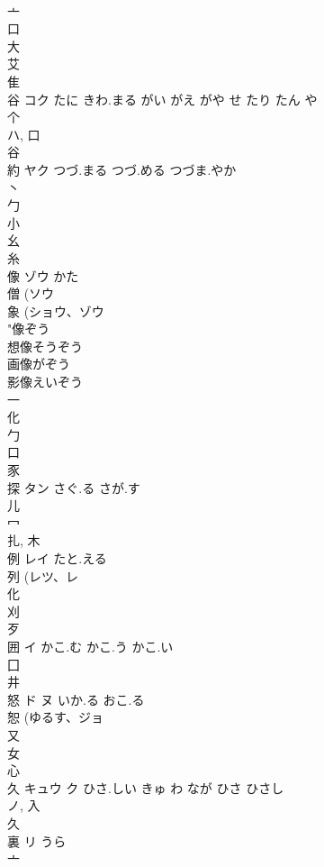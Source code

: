 \documentclass[8pt]{extreport}
\begin{document}
\begin{CJK}{UTF8}{min}
\\	亠 
\\	口 
\\	大 
\\	艾 
\\	隹 
\\	谷	コク	たに きわ.まる がい がえ がや せ たり たん や	
\\	个 
\\	ハ, 口 
\\	谷 
\\	約	ヤク	つづ.まる つづ.める つづま.やか	
\\	丶 
\\	勹 
\\	小 
\\	幺 
\\	糸 
\\	像	ゾウ	かた	
\\	僧 (ソウ 
\\	象 (ショウ、ゾウ 
\\	"像ぞう
\\	想像そうぞう
\\	画像がぞう
\\	影像えいぞう
\\	一 
\\	化 
\\	勹 
\\	口 
\\	豕 
\\	探	タン	さぐ.る さが.す	
\\	儿 
\\	冖 
\\	扎, 木 
\\	例	レイ	たと.える	
\\	列 (レツ、レ 
\\	化 
\\	刈 
\\	歹 
\\	囲	イ	かこ.む かこ.う かこ.い	
\\	囗 
\\	井 
\\	怒	ド ヌ	いか.る おこ.る	
\\	恕 (ゆるす、ジョ 
\\	又 
\\	女 
\\	心 
\\	久	キュウ ク	ひさ.しい きゅ わ なが ひさ ひさし	
\\	ノ, 入 
\\	久 
\\	裏	リ	うら	
\\	亠 

\end{CJK}
\end{document}
